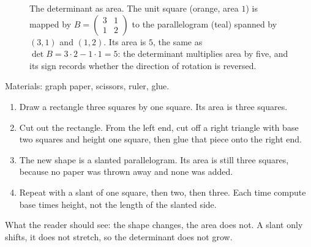 \begin{figure}[htbp]
\centering
{}
\caption{The determinant as area. The unit square (orange, area $1$) is mapped by
$B=\begin{pmatrix}3&1\\ 1&2\end{pmatrix}$ to the parallelogram (teal) spanned by
$(3,1)$ and $(1,2)$. Its area is $5$, the same as $\det B=3\cdot2-1\cdot1=5$: the determinant
multiplies area by five, and its sign records whether the direction of rotation is reversed.}
\label{fig:luas-determinan}
\end{figure}

\begin{tangan}
Materials: graph paper, scissors, ruler, glue.
\begin{enumerate}
  \item Draw a rectangle three squares by one square. Its area is three squares.
  \item Cut out the rectangle. From the left end, cut off a right triangle with base two squares
        and height one square, then glue that piece onto the right end.
  \item The new shape is a slanted parallelogram. Its area is still three squares, because no
        paper was thrown away and none was added.
  \item Repeat with a slant of one square, then two, then three. Each time compute base times
        height, not the length of the slanted side.
\end{enumerate}
What the reader should see: the shape changes, the area does not. A slant only shifts, it does
not stretch, so the determinant does not grow.
\end{tangan}

